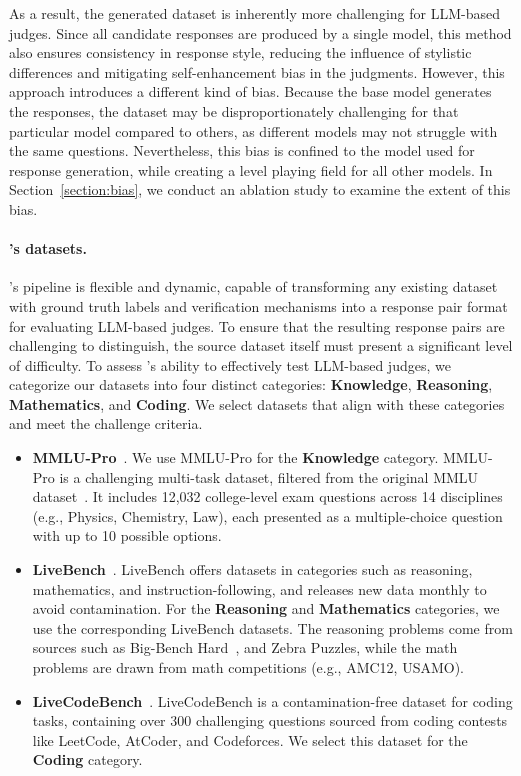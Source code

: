 \documentclass{article} %
\begin{document}
As a result, the generated dataset is inherently more challenging for LLM-based judges. Since all candidate responses are produced by a single model, this method also ensures consistency in response style, reducing the influence of stylistic differences and mitigating self-enhancement bias in the judgments. However, this approach introduces a different kind of bias. Because the base model generates the responses, the dataset may be disproportionately challenging for that particular model compared to others, as different models may not struggle with the same questions. Nevertheless, this bias is confined to the model used for response generation, while creating a level playing field for all other models. In Section~\ref{section:bias}, we conduct an ablation study to examine the extent of this bias.

\paragraph{\sys's datasets.} \sys's pipeline is flexible and dynamic, capable of transforming any existing dataset with ground truth labels and verification mechanisms into a response pair format for evaluating LLM-based judges. To ensure that the resulting response pairs are challenging to distinguish, the source dataset itself must present a significant level of difficulty. To assess \sys's ability to effectively test LLM-based judges, we categorize our datasets into four distinct categories: \textbf{Knowledge}, \textbf{Reasoning}, \textbf{Mathematics}, and \textbf{Coding}. We select datasets that align with these categories and meet the challenge criteria.

\begin{itemize} 
\item \textbf{MMLU-Pro}~\citep{wang2024mmlupro}. We use MMLU-Pro for the  \textbf{Knowledge} category. MMLU-Pro is a challenging multi-task dataset, filtered from the original MMLU dataset~\citep{hendrycks2020mmlu}. It includes 12,032 college-level exam questions across 14 disciplines (e.g., Physics, Chemistry, Law), each presented as a multiple-choice question with up to 10 possible options.
\item \textbf{LiveBench}~\citep{white2024livebench}. LiveBench offers datasets in categories such as reasoning, mathematics, and instruction-following, and releases new data monthly to avoid contamination. For the \textbf{Reasoning} and \textbf{Mathematics} categories, we use the corresponding LiveBench datasets. The reasoning problems come from sources such as Big-Bench Hard~\citep{suzgun2022bigbench}, and Zebra Puzzles, while the math problems are drawn from math competitions (e.g., AMC12, USAMO).
\item \textbf{LiveCodeBench}~\citep{jain2024livecodebench}. LiveCodeBench is a contamination-free dataset for coding tasks, containing over 300 challenging questions sourced from coding contests like LeetCode, AtCoder, and Codeforces. We select this dataset for the \textbf{Coding} category.
\end{itemize}
\end{document}
